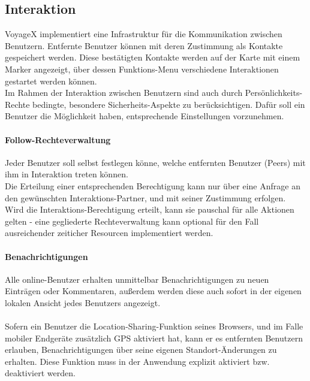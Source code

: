 \subsection{Interaktion}
VoyageX implementiert eine Infrastruktur für die Kommunikation zwischen Benutzern. Entfernte Benutzer können mit deren Zustimmung als Kontakte gespeichert werden. Diese bestätigten Kontakte werden auf der Karte mit einem Marker angezeigt, über dessen Funktions-Menu verschiedene Interaktionen gestartet werden können.\\
Im Rahmen der Interaktion zwischen Benutzern sind auch durch Persönlichkeits-Rechte bedingte, besondere Sicherheits-Aspekte zu berücksichtigen. Dafür soll ein Benutzer die Möglichkeit haben, entsprechende Einstellungen vorzunehmen.

\paragraph{Follow-Rechteverwaltung}
Jeder Benutzer soll selbst festlegen könne, welche entfernten Benutzer (Peers) mit ihm in Interaktion
treten können.\\
Die Erteilung einer entsprechenden Berechtigung kann nur über eine Anfrage an den gewünschten Interaktions-Partner, und mit seiner Zustimmung erfolgen. Wird die Interaktions-Berechtigung erteilt, kann sie pauschal für alle Aktionen gelten - eine gegliederte Rechteverwaltung kann optional für den Fall ausreichender zeiticher Resourcen implementiert werden.

\paragraph{Benachrichtigungen}
Alle online-Benutzer erhalten unmittelbar Benachrichtigungen zu neuen Einträgen oder Kommentaren, außerdem werden diese auch sofort in der eigenen lokalen Ansicht jedes Benutzers angezeigt.\\ \\
Sofern ein Benutzer die Location-Sharing-Funktion seines Browsers, und im Falle mobiler Endgeräte zusätzlich GPS aktiviert hat, kann er es entfernten Benutzern erlauben, Benachrichtigungen über seine eigenen Standort-Änderungen zu erhalten. Diese Funktion muss in der Anwendung explizit aktiviert bzw. deaktiviert werden.

